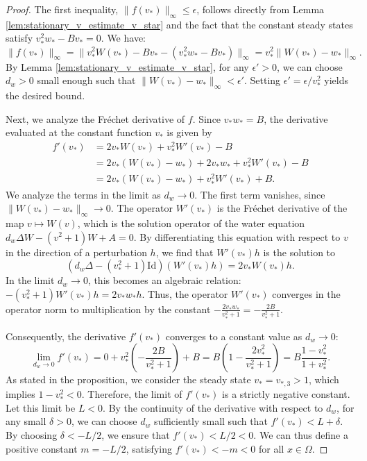 \documentclass[11pt, a4paper]{article}
\theoremstyle{break}
\theoremstyle{break}
\theoremstyle{break}
\theoremstyle{break}
\theoremstyle{break}
\theoremstyle{break}
\theoremstyle{break}
\theoremstyle{break}
\theoremstyle{break}
\theoremstyle{break}
\begin{document}
\begin{proof}
    The first inequality, $\|f(v_*)\|_\infty \leq \epsilon$, follows directly from Lemma \ref{lem:stationary_v_estimate_v_star} and the fact that the constant steady states satisfy $v_*^2w_* - Bv_* = 0$. We have:
    \begin{equation*}
        \|f(v_*)\|_\infty 
        =
        \|v_*^2W(v_*) - Bv_* - (v_*^2w_* - Bv_*)\|_\infty
        =
        v_*^2\|W(v_*) - w_*\|_\infty.
    \end{equation*}
    By Lemma \ref{lem:stationary_v_estimate_v_star}, for any $\epsilon' > 0$, we can choose $d_w > 0$ small enough such that $\|W(v_*) - w_*\|_\infty < \epsilon'$. Setting $\epsilon' = \epsilon / v_*^2$ yields the desired bound.

    Next, we analyze the Fr\'echet derivative of $f$. Since $v_*w_* = B$, the derivative evaluated at the constant function $v_*$ is given by
    \begin{align*}
        f'(v_*) 
        &=
        2v_*W(v_*) + v_*^2W'(v_*) - B \\
        &=
        2v_*(W(v_*) - w_*) + 2v_*w_* + v_*^2W'(v_*) - B \\
        &=
        2v_*(W(v_*) - w_*) + v_*^2W'(v_*) + B.
    \end{align*}
    We analyze the terms in the limit as $d_w \to 0$. The first term vanishes, since $\|W(v_*) - w_*\|_\infty \to 0$. The operator $W'(v_*)$ is the Fr\'echet derivative of the map $v \mapsto W(v)$, which is the solution operator of the water equation $d_w \Delta W - (v^2+1)W + A = 0$. By differentiating this equation with respect to $v$ in the direction of a perturbation $h$, we find that $W'(v_*)h$ is the solution to
    \begin{equation*}
        (d_w \Delta - (v_*^2+1)\mathrm{Id})(W'(v_*)h) = 2v_* W(v_*) h.
    \end{equation*}
    In the limit $d_w \to 0$, this becomes an algebraic relation: $-(v_*^2+1)W'(v_*)h = 2v_* w_* h$. Thus, the operator $W'(v_*)$ converges in the operator norm to multiplication by the constant $-\frac{2v_*w_*}{v_*^2+1} = -\frac{2B}{v_*^2+1}$.
    
    Consequently, the derivative $f'(v_*)$ converges to a constant value as $d_w \to 0$:
    \begin{equation*}
        \lim_{d_w \to 0} f'(v_*) = 0 + v_*^2 \left( -\frac{2B}{v_*^2+1} \right) + B = B \left( 1 - \frac{2v_*^2}{v_*^2+1} \right) = B \frac{1-v_*^2}{1+v_*^2}.
    \end{equation*}
    As stated in the proposition, we consider the steady state $v_* = v_{*,3} > 1$, which implies $1 - v_*^2 < 0$. Therefore, the limit of $f'(v_*)$ is a strictly negative constant. Let this limit be $L < 0$. By the continuity of the derivative with respect to $d_w$, for any small $\delta > 0$, we can choose $d_w$ sufficiently small such that $f'(v_*) < L + \delta$. By choosing $\delta < -L/2$, we ensure that $f'(v_*) < L/2 < 0$. We can thus define a positive constant $m = -L/2$, satisfying $f'(v_*) < -m < 0$ for all $x \in \Omega$.


\end{proof}
\end{document}
